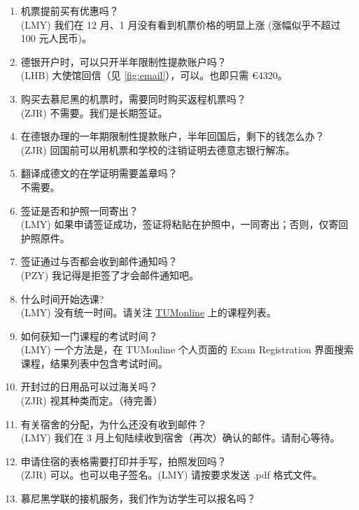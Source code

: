 \documentclass{ctexart}
\begin{document}
\begin{enumerate}
  (LMY) \href{https://service2.diplo.de/rktermin/extern/choose_category.do?locationCode=peki&realmId=12&categoryId=156&request_locale=de}{在线系统预约签证受理}。见 \ref{sec:visa} 节。请务必选择德语界面。英语界面会有部分文字缺失。德语界面在填写时会提供 德/英/中 三语。
  \item 机票提前买有优惠吗？ \\
  (LMY) 我们在 12 月、1 月没有看到机票价格的明显上涨 (涨幅似乎不超过 100 元人民币)。
  \item 德银开户时，可以只开半年限制性提款账户吗？ \\
  (LHB) 大使馆回信（见 \ref{fig:email}），可以。也即只需 \euro{4320}。
  \item 购买去慕尼黑的机票时，需要同时购买返程机票吗？ \\
  (ZJR) 不需要。我们是长期签证。
  \item 在德银办理的一年期限制性提款账户，半年回国后，剩下的钱怎么办？ \\
  (ZJR) 回国前可以用机票和学校的注销证明去德意志银行解冻。
  \item 翻译成德文的在学证明需要盖章吗？ \\
  不需要。
  \item 签证是否和护照一同寄出？ \\
  (LMY) 如果申请签证成功，签证将粘贴在护照中，一同寄出；否则，仅寄回护照原件。
  \item 签证通过与否都会收到邮件通知吗？ \\
  (PZY) 我记得是拒签了才会邮件通知吧。
  \item 什么时间开始选课? \\
  (LMY) 没有统一时间。请关注 \href{campus.tum.de}{TUMonline} 上的课程列表。
  \item 如何获知一门课程的考试时间？ \\
  (LMY) 一个方法是，在 TUMonline 个人页面的 Exam Registration 界面搜索课程，结果列表中包含考试时间。
  \item 开封过的日用品可以过海关吗？ \\
  (ZJR) 视其种类而定。（待完善）
  \item 有关宿舍的分配，为什么还没有收到邮件？ \\
  (LMY) 我们在 3 月上旬陆续收到宿舍（再次）确认的邮件。请耐心等待。
  \item 申请住宿的表格需要打印并手写，拍照发回吗？ \\
  (ZJR) 可以。也可以电子签名。(LMY) 请按要求发送 .pdf 格式文件。
  \item 慕尼黑学联的接机服务，我们作为访学生可以报名吗？ \\

\end{enumerate}
\end{document}
